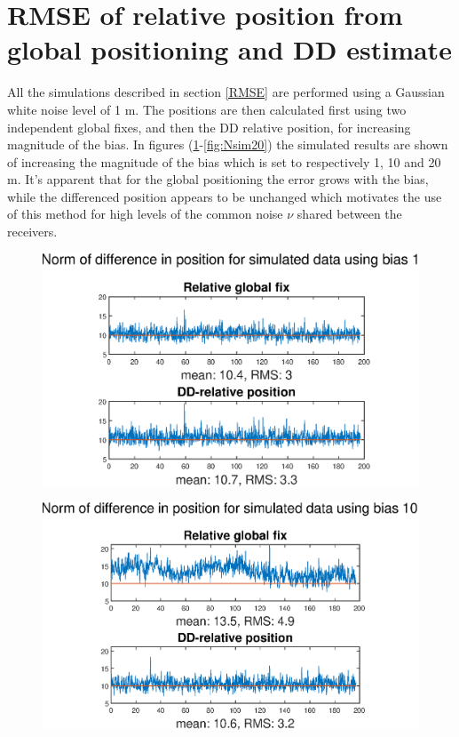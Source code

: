 \section{RMSE of relative position from global positioning and DD estimate }\label{RMSEsection}
All the simulations described in section \ref{RMSE} are performed using a Gaussian white noise level of 1 m. The positions are then calculated first using two independent global fixes, and then the DD relative position, for increasing magnitude of the bias. In figures (\ref{fig:Nsim1}-\ref{fig:Nsim20}) the simulated results are shown of increasing the magnitude of the bias which is set to respectively 1, 10 and 20 m. It's apparent that for the global positioning the error grows with the bias, while the differenced position appears to be unchanged which motivates the use of this method for high levels of the common noise $\nu$ shared between the receivers.
\begin{figure}[!htb]
\includegraphics[width=\textwidth]{Results/MSEplots/Nsim1.eps}
\caption{\label{fig:Nsim1}}
\end{figure}
\begin{figure}[!htb]
\includegraphics[width=\textwidth]{Results/MSEplots/Nsim10.eps}
\caption{\label{fig:Nsim10}}
\end{figure}
